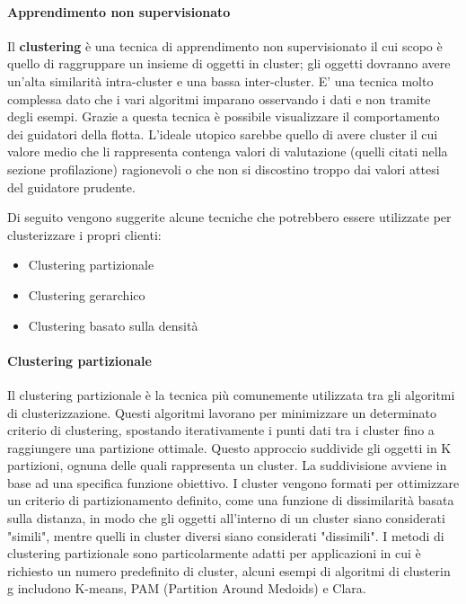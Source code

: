 \documentclass[12pt, a4paper, italian]{report}
\numberwithin{figure}{chapter}
\numberwithin{table}{chapter}
\begin{document}
\paragraph{Apprendimento non supervisionato}
Il \textbf{clustering} è una tecnica di apprendimento non supervisionato il cui scopo è quello di raggruppare un insieme di oggetti in cluster; gli oggetti dovranno avere un'alta similarità intra-cluster e una bassa inter-cluster. E' una tecnica molto complessa dato che i vari algoritmi imparano osservando i dati e non tramite degli esempi. Grazie a questa tecnica è possibile visualizzare il comportamento dei guidatori della flotta. L'ideale utopico sarebbe quello di avere cluster il cui valore medio che li rappresenta contenga valori di valutazione (quelli citati nella sezione profilazione) ragionevoli o che non si discostino troppo dai valori attesi del guidatore prudente.

\vspace{0.5cm}
Di seguito vengono suggerite alcune tecniche che potrebbero essere utilizzate per clusterizzare i propri clienti: 

\begin{itemize}
    \item Clustering partizionale
    \item Clustering gerarchico
    \item Clustering basato sulla densità
\end{itemize}

\paragraph{Clustering partizionale} 
Il clustering partizionale è la tecnica più comunemente utilizzata tra gli algoritmi di clusterizzazione. Questi algoritmi lavorano per minimizzare un determinato criterio di clustering, spostando iterativamente i punti dati tra i cluster fino a raggiungere una partizione ottimale. Questo approccio suddivide gli oggetti in K partizioni, ognuna delle quali rappresenta un cluster. La suddivisione avviene in base ad una specifica funzione obiettivo. I cluster vengono formati per ottimizzare un criterio di partizionamento definito, come una funzione di dissimilarità basata sulla distanza, in modo che gli oggetti all'interno di un cluster siano considerati "simili", mentre quelli in cluster diversi siano considerati "dissimili". I metodi di clustering partizionale sono particolarmente adatti per applicazioni in cui è richiesto un numero predefinito di cluster, alcuni esempi di algoritmi di clusterin g includono K-means, PAM (Partition Around Medoids) e Clara.
\end{document}
